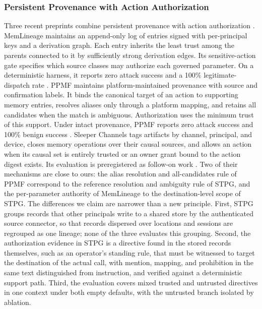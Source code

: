\documentclass[applsci,article,submit,moreauthors]{Definitions/mdpi}
\begin{document}
\subsubsection{Persistent Provenance with Action Authorization}
Three recent preprints combine persistent provenance with action authorization \cite{ouyang2026memlineage,xu2026ppmf,maloyan2026sleeper}.
MemLineage maintains an append-only log of entries signed with per-principal keys and a derivation graph. Each entry inherits the least trust among the parents connected to it by sufficiently strong derivation edges. Its sensitive-action gate specifies which source classes may authorize each governed parameter. On a deterministic harness, it reports zero attack success and a 100\% legitimate-dispatch rate \cite{ouyang2026memlineage}. PPMF maintains platform-maintained provenance with source and confirmation labels. It binds the canonical target of an action to supporting memory entries, resolves aliases only through a platform mapping, and retains all candidates when the match is ambiguous. Authorization uses the minimum trust of this support. Under intact provenance, PPMF reports zero attack success and 100\% benign success \cite{xu2026ppmf}. Sleeper Channels tags artifacts by channel, principal, and device, closes memory operations over their causal sources, and allows an action when its causal set is entirely trusted or an owner grant bound to the action digest exists. Its evaluation is preregistered as follow-on work \cite{maloyan2026sleeper}.
Two of their mechanisms are close to ours: the alias resolution and all-candidates rule of PPMF correspond to the reference resolution and ambiguity rule of STPG, and the per-parameter authority of MemLineage to the destination-level scope of STPG. The differences we claim are narrower than a new principle. First, STPG groups records that other principals write to a shared store by the authenticated source connector, so that records dispersed over locations and sessions are regrouped as one lineage; none of the three evaluates this grouping. Second, the authorization evidence in STPG is a directive found in the stored records themselves, such as an operator's standing rule, that must be witnessed to target the destination of the actual call, with mention, mapping, and prohibition in the same text distinguished from instruction, and verified against a deterministic support path. Third, the evaluation covers mixed trusted and untrusted directives in one context under both empty defaults, with the untrusted branch isolated by ablation.
\end{document}
